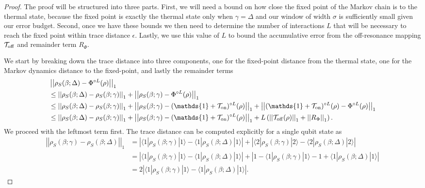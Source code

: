 \documentclass[
 amsmath,amssymb,
 aps,
onecolumn, 
nofootinbib]{revtex4-2}
\newcommand{\on}{\rm on}
\newcommand{\off}{\rm off}
\newcommand{\ket}[1]{|#1\rangle}
\newcommand{\bra}[1]{\langle #1|}
\newcommand{\abs}[1]{\left| #1 \right|}
\newcommand{\norm}[1]{\left|\left| #1 \right|\right|}
\newcommand{\identity}{\mathds{1}}
\begin{document}
\begin{proof}
    The proof will be structured into three parts. First, we will need a bound on how close the fixed point of the Markov chain is to the thermal state, because  the fixed point  is exactly the thermal state only when $\gamma = \Delta$ and our window of width $\sigma$ is sufficiently small given our error budget. Second, once we have these bounds we then need to determine the number of interactions $L$ that will be necessary to reach the fixed point within trace distance $\epsilon$. Lastly, we use this value of $L$ to bound the accumulative error from the off-resonance mapping $\mathcal{T}_{\off}$ and remainder term $R_{\Phi}$.

    We start by breaking down the trace distance into three components, one for the fixed-point distance from the thermal state, one for the Markov dynamics distance to the fixed-point, and lastly the remainder terms
    \begin{align}
        &\norm{\rho_S(\beta; \Delta) - \Phi^{\circ L}(\rho)}_1 \nonumber \\
        &\le \norm{\rho_S(\beta; \Delta) - \rho_S(\beta; \gamma)}_1 + \norm{\rho_S(\beta; \gamma) - \Phi^{\circ L}(\rho)}_1 \\
        &\le \norm{\rho_S(\beta; \Delta) - \rho_S(\beta; \gamma)}_1 + \norm{\rho_S(\beta; \gamma) - (\identity + \mathcal{T}_{\on})^{\circ L}(\rho)}_1 + \norm{(\identity + \mathcal{T}_{\on})^{\circ L}(\rho) - \Phi^{\circ L}(\rho)}_1 \\
        &\le \norm{\rho_S(\beta; \Delta) - \rho_S(\beta; \gamma)}_1 + \norm{\rho_S(\beta; \gamma) - (\identity + \mathcal{T}_{\on})^{\circ L}(\rho)}_1 +  L \left(\norm{\mathcal{T}_{\off}(\rho)}_1 + \norm{R_{\Phi}}_1 \right). \label{eq:single_qubit_three_errors}
    \end{align}
    We proceed with the leftmost term first. The trace distance can be computed explicitly for a single qubit state as 
 \begin{align}
     \norm{\rho_S(\beta; \gamma) - \rho_S(\beta; \Delta)}_1 &= \abs{\bra{1} \rho_S(\beta; \gamma) \ket{1} - \bra{1}\rho_S(\beta;\Delta)\ket{1}} + \abs{\bra{2} \rho_S(\beta; \gamma) \ket{2} - \bra{2}\rho_S(\beta; \Delta)\ket{2}} \\
     &= \abs{\bra{1} \rho_S(\beta; \gamma) \ket{1} - \bra{1}\rho_S(\beta; \Delta)\ket{1}} + \abs{1 - \bra{1} \rho_S(\beta; \gamma) \ket{1} -1 + \bra{1}\rho_S(\beta; \Delta)\ket{1}} \\
     &= 2 \abs{\bra{1} \rho_S(\beta; \gamma) \ket{1} - \bra{1}\rho_S(\beta; \Delta)\ket{1}}. \label{eq:single_qubit_int_1}

\end{align}
\end{proof}
\end{document}

